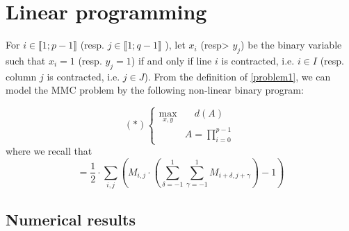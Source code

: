 
\section{Linear programming}\label{sec:linearprog}

For $i \in \llbracket 1; p-1 \rrbracket$ (resp.  $j \in \llbracket 1; q-1 \rrbracket$ ), let $x_i$ (resp> $y_j$) be the binary variable such that $x_i=1$ (resp. $y_j=1$) if and only if line $i$ is contracted, i.e. $i \in I$ (resp. column $j$ is contracted, i.e. $j \in J$). From the definition of \ref{problem1}, we can model the MMC problem by the following non-linear binary program:

\begin{equation*}
(\ast)\left\{
\begin{array}{lll}
\max\limits_{x,y} & \quad	d(A)  \\
& A= \prod\limits_{i=0}^{p-1}
\end{array}\right.
\end{equation*}
where we recall that $$= \frac{1}{2} \cdot \sum\limits_{i,j} \left( M_{i,j} \cdot \left(\sum\limits_{\delta = -1}^1 \sum\limits_{\gamma = -1}^1  M_{i+\delta,j+\gamma}\right) - 1 \right)$$

\begin{comment}
\begin{itemize}
\item Si c'est pas fait dans la section 2, présenter le programme non linéaire et expliquer pourquoi il ne peut être linéarisé tel quel
\item Présentation de la version temporisée
\item Remarque sur la exactitude du programme
\end{itemize}
\end{comment}

\subsection{Numerical results}

